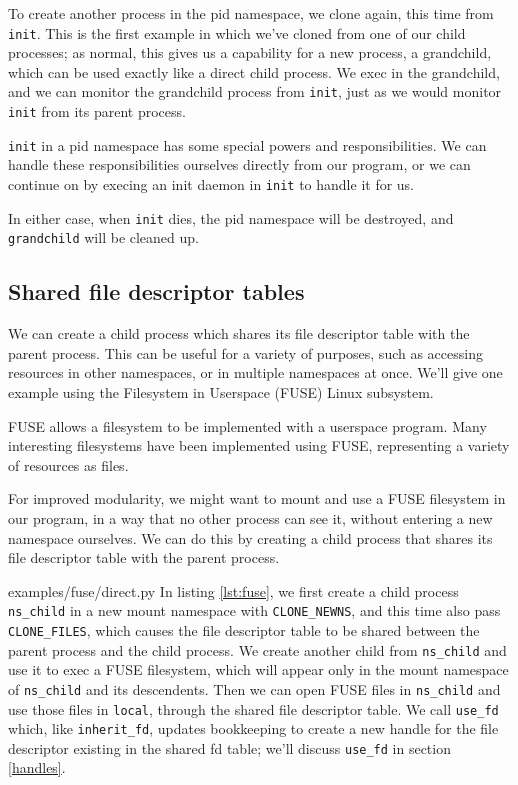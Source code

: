 \documentclass[letterpaper,twocolumn,10pt]{article}
\begin{document}
To create another process in the pid namespace,
we clone again, this time from \texttt{init}.
This is the first example in which we've cloned from one of our child processes;
as normal, this gives us a capability for a new process, a grandchild,
which can be used exactly like a direct child process.
We exec in the grandchild,
and we can monitor the grandchild process from \texttt{init},
just as we would monitor \texttt{init} from its parent process.

\texttt{init} in a pid namespace has some special powers and responsibilities.
We can handle these responsibilities ourselves directly from our program,
or we can continue on by execing an init daemon in \texttt{init} to handle it for us.
\cite{pid_namespaces}\cite{tini}\cite{dumb_init}

In either case, when \texttt{init} dies,
the pid namespace will be destroyed,
and \texttt{grandchild} will be cleaned up.
\subsection{Shared file descriptor tables}\label{shared_fd_table}
We can create a child process which shares its file descriptor table with the parent process.
This can be useful for a variety of purposes,
such as accessing resources in other namespaces, or in multiple namespaces at once.
We'll give one example using the Filesystem in Userspace (FUSE) Linux subsystem.

FUSE allows a filesystem to be implemented with a userspace program.\cite{fuse}
Many interesting filesystems have been implemented using FUSE,
representing a variety of resources as files.\cite{sshfs}\cite{encfs}\cite{mp3fs}

For improved modularity, we might want to mount and use a FUSE filesystem in our program,
in a way that no other process can see it,
without entering a new namespace ourselves.
We can do this by creating a child process that shares its file descriptor table with the parent process.


{examples/fuse/direct.py}
In listing \ref{lst:fuse},
we first create a child process \verb|ns_child| in a new mount namespace with \verb|CLONE_NEWNS|,
and this time also pass \verb|CLONE_FILES|,
which causes the file descriptor table to be shared between the parent process and the child process.\cite{clone}
We create another child from \verb|ns_child|
and use it to exec a FUSE filesystem,
which will appear only in the mount namespace of \verb|ns_child| and its descendents.
Then we can open FUSE files in \verb|ns_child|
and use those files in \texttt{local},
through the shared file descriptor table.
We call \texttt{use\_fd} which, like \texttt{inherit\_fd},
updates bookkeeping to create a new handle for the file descriptor existing in the shared fd table;
we'll discuss \texttt{use\_fd} in section \ref{handles}.
\end{document}
